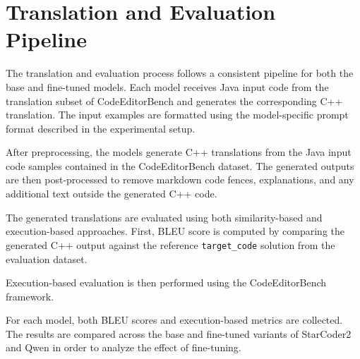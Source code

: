 \section{Translation and Evaluation Pipeline}

The translation and evaluation process follows a consistent pipeline for both
the base and fine-tuned models. Each model receives Java input code from the
translation subset of CodeEditorBench and generates the corresponding C++
translation. The input examples are formatted using the model-specific prompt
format described in the experimental setup.

After preprocessing, the models generate C++ translations from the Java input
code samples contained in the CodeEditorBench dataset. The generated outputs
are then post-processed to remove markdown code fences, explanations, and any
additional text outside the generated C++ code.

The generated translations are evaluated using both similarity-based and
execution-based approaches. First, BLEU score is computed by comparing the
generated C++ output against the reference \texttt{target\_code} solution from
the evaluation dataset.

Execution-based evaluation is then performed using the CodeEditorBench
framework.

For each model, both BLEU scores and execution-based metrics are collected. The
results are compared across the base and fine-tuned variants of StarCoder2 and
Qwen in order to analyze the effect of fine-tuning.